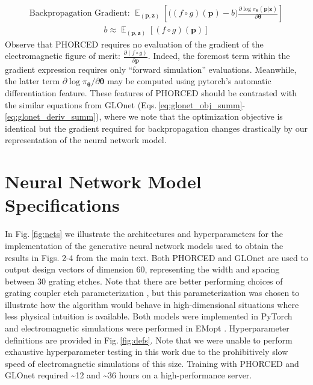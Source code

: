 \documentclass{article}
\DeclareMathOperator*{\EX}{\mathbb{E}}%
\begin{document}
\begin{align}
    \boxed{\text{Backpropagation Gradient: } \EX_{(\mathbf{p},\mathbf{z})}\left[\big((f\circ g)(\mathbf{p})-b \big)  \frac{\partial \log \pi_{\boldsymbol{\theta}}(\mathbf{p}|\mathbf{z})}{\partial \boldsymbol{\theta}}\right]}
\end{align}
\begin{align}
    \boxed{b\approx \EX_{(\mathbf{p},\mathbf{z})}\left[(f\circ g)(\mathbf{p})\right]}
\end{align}
Observe that PHORCED requires no evaluation of the gradient of the electromagnetic figure of merit: $\frac{\partial (f\circ g)}{\partial \mathbf{p}}$. Indeed, the foremost term within the gradient expression requires only ``forward simulation'' evaluations. Meanwhile, the latter term $\partial \log \pi_{\boldsymbol{\theta}}/\partial \boldsymbol{\theta}$ may be computed using pytorch's automatic differentiation feature. These features of PHORCED should be contrasted with the similar equations from GLOnet (Eqs.\,\eqref{eq:glonet_obj_summ}-\eqref{eq:glonet_deriv_summ}), where we note that the optimization objective is identical but the gradient required for backpropagation changes drastically by our representation of the neural network model.

\section{Neural Network Model Specifications}
In Fig.\,\ref{fig:nets} we illustrate the architectures and hyperparameters for the implementation of the generative neural network models used to obtain the results in Figs. 2-4 from the main text. Both PHORCED and GLOnet are used to output design vectors of dimension 60, representing the width and spacing between 30 grating etches. Note that there are better performing choices of grating coupler etch parameterization \cite{michaels_inverse_2018, hooten_adjoint_2020}, but this parameterization was chosen to illustrate how the algorithm would behave in high-dimensional situations where less physical intuition is available. Both models were implemented in PyTorch and electromagnetic simulations were performed in EMopt \cite{michaels_emopt_2019}. Hyperparameter definitions are provided in Fig.\,\ref{fig:defs}. Note that we were unable to perform exhaustive hyperparameter testing in this work due to the prohibitively slow speed of electromagnetic simulations of this size. Training with PHORCED and GLOnet required \textasciitilde 12 and \textasciitilde 36 hours on a high-performance server.
\end{document}
